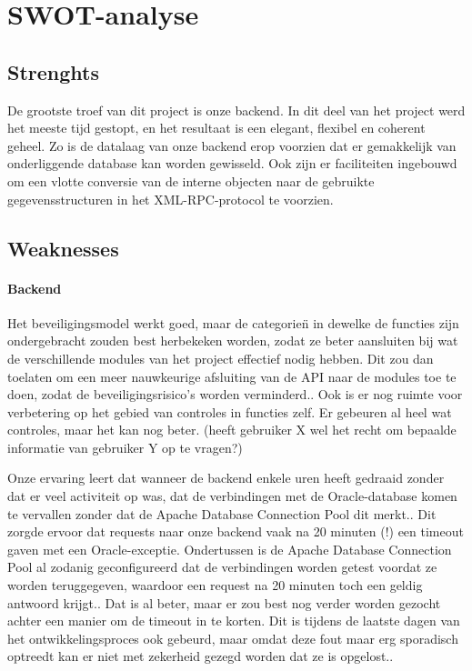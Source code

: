 \section{SWOT-analyse}

\subsection{Strenghts}

De grootste troef van dit project is onze backend. In dit deel van het project werd het meeste tijd gestopt, en het resultaat is een elegant, flexibel en coherent geheel. 
Zo is de datalaag van onze backend erop voorzien dat er gemakkelijk van onderliggende database kan worden gewisseld. Ook zijn er faciliteiten ingebouwd om een vlotte conversie van de interne objecten naar de gebruikte gegevensstructuren in het XML-RPC-protocol te voorzien.

\subsection{Weaknesses}

\paragraph{Backend} Het beveiligingsmodel werkt goed, maar de categorie\"n in dewelke de functies zijn ondergebracht zouden best herbekeken worden, zodat ze beter aansluiten bij wat de verschillende modules van het project effectief nodig hebben. Dit zou dan toelaten om een meer nauwkeurige afsluiting van de API naar de modules toe te doen, zodat de beveiligingsrisico's worden verminderd.. Ook is er nog ruimte voor verbetering op het gebied van controles in functies zelf. Er gebeuren al heel wat controles, maar het kan nog beter. (heeft gebruiker X wel het recht om bepaalde informatie van gebruiker Y op te vragen?)

Onze ervaring leert dat wanneer de backend enkele uren heeft gedraaid zonder dat er veel activiteit op was, dat de verbindingen met de Oracle-database komen te vervallen zonder dat de Apache Database Connection Pool dit merkt.. Dit zorgde ervoor dat requests naar onze backend vaak na 20 minuten (!) een timeout gaven met een Oracle-exceptie. Ondertussen is de Apache Database Connection Pool al zodanig geconfigureerd dat de verbindingen worden getest voordat ze worden teruggegeven, waardoor een request na 20 minuten toch een geldig antwoord krijgt.. Dat is al beter, maar er zou best nog verder worden gezocht achter een manier om de timeout in te korten. Dit is tijdens de laatste dagen van het ontwikkelingsproces ook gebeurd, maar omdat deze fout maar erg sporadisch optreedt kan er niet met zekerheid gezegd worden dat ze is opgelost..

